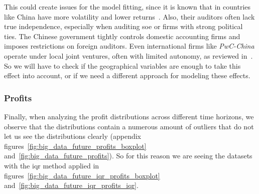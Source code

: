 \documentclass[11pt,english,a4paper,hidelinks]{book}
\begin{document}
\newpage
\noindent This could create issues for the model fitting, since it is known that in countries like China have more volatility and lower returns~\cite{chen2024economic}. Also, their auditors often lack true independence, especially when auditing \gls{soe} or firms with strong political ties. The Chinese government tightly controls domestic accounting firms and imposes restrictions on foreign auditors. Even international firms like \textit{PwC-China} operate under local joint ventures, often with limited autonomy, as reviewed in~\cite{LIU2012782}. So we will have to check if the geographical variables are enough to take this effect into account, or if we need a different approach for modeling these effects.

\subsubsection{Profits}

\noindent Finally, when analyzing the profit distributions across different time horizons, we observe that the distributions contain a numerous amount of outliers that do not let us see the distributions clearly (appendix figures~\ref{fig:big_data_future_profits_boxplot} and~\ref{fig:big_data_future_profits}). So for this reason we are seeing the datasets with the \acrshort{iqr} method applied in figures~\ref{fig:big_data_future_iqr_profits_boxplot} and~\ref{fig:big_data_future_iqr_profits_iqr}.
\end{document}
